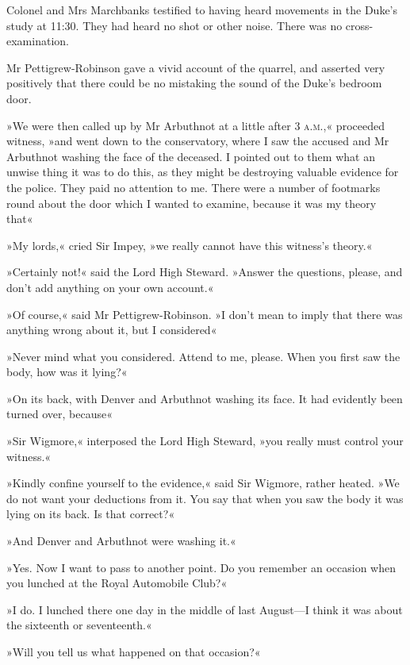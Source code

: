 Colonel and Mrs Marchbanks testified to having heard movements in the Duke's study at 11:30. They had heard no shot or other noise. There was no cross-examination.

Mr Pettigrew-Robinson gave a vivid account of the quarrel, and asserted very positively that there could be no mistaking the sound of the Duke's bedroom door.

»We were then called up by Mr Arbuthnot at a little after 3 \textsc{a.m.},« proceeded witness, »and went down to the conservatory, where I saw the accused and Mr Arbuthnot washing the face of the deceased. I pointed out to them what an unwise thing it was to do this, as they might be destroying valuable evidence for the police. They paid no attention to me. There were a number of footmarks round about the door which I wanted to examine, because it was my theory that\longdash«

»My lords,« cried Sir Impey, »we really cannot have this witness's theory.«

»Certainly not!« said the Lord High Steward. »Answer the questions, please, and don't add anything on your own account.«

»Of course,« said Mr Pettigrew-Robinson. »I don't mean to imply that there was anything wrong about it, but I considered\longdash«

»Never mind what you considered. Attend to me, please. When you first saw the body, how was it lying?«

»On its back, with Denver and Arbuthnot washing its face. It had evidently been turned over, because\longdash«

»Sir Wigmore,« interposed the Lord High Steward, »you really must control your witness.«

»Kindly confine yourself to the evidence,« said Sir Wigmore, rather heated. »We do not want your deductions from it. You say that when you saw the body it was lying on its back. Is that correct?«

»And Denver and Arbuthnot were washing it.«

»Yes. Now I want to pass to another point. Do you remember an occasion when you lunched at the Royal Automobile Club?«

»I do. I lunched there one day in the middle of last August\allowbreak---\allowbreak I think it was about the sixteenth or seventeenth.«

»Will you tell us what happened on that occasion?«


